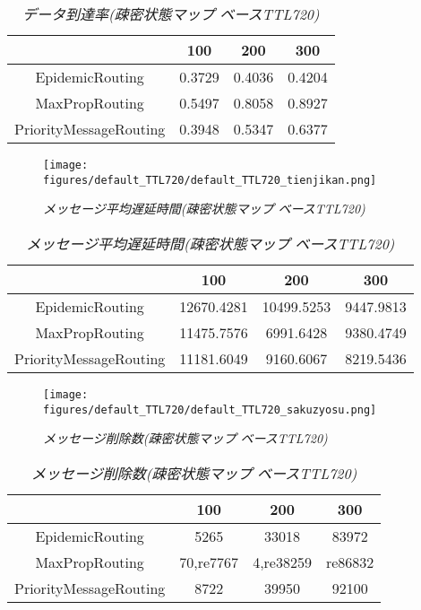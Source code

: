 \documentclass[11pt]{icsthesis}
\begin{document}
\begin{table}[H]
 \begin{center}
      \caption[]{\it{データ到達率(疎密状態マップ ベースTTL720)}}
      \label{somituTtl720deliveryprob}
      \begin{tabular}{|c|c|c|c|}
\hline
&100&200&300\\
\hline
EpidemicRouting&0.3729&0.4036&0.4204\\
\hline
MaxPropRouting&0.5497&0.8058&0.8927\\
\hline
PriorityMessageRouting&0.3948&0.5347&0.6377\\
\hline
      \end{tabular}
    \end{center}
\end{table}

\newpage

\begin{figure}[h]
\centering
\texttt{[image: figures/default\_TTL720/default\_TTL720\_tienjikan.png]}
\caption[]{\it{メッセージ平均遅延時間(疎密状態マップ ベースTTL720)}}
\label{somituttl720latencyavggraph}
\end{figure}

\begin{table}[H]
 \begin{center}
      \caption[]{\it{メッセージ平均遅延時間(疎密状態マップ ベースTTL720)}}
      \label{somituTtl720latencyavg}
      \begin{tabular}{|c|c|c|c|}
\hline
&100&200&300\\
\hline
EpidemicRouting&12670.4281&10499.5253&9447.9813\\
\hline
MaxPropRouting&11475.7576&6991.6428&9380.4749\\
\hline
PriorityMessageRouting&11181.6049&9160.6067&8219.5436\\
\hline
      \end{tabular}
    \end{center}
\end{table}

\begin{figure}[h]
\centering
\texttt{[image: figures/default\_TTL720/default\_TTL720\_sakuzyosu.png]}
\caption[]{\it{メッセージ削除数(疎密状態マップ ベースTTL720)}}
\label{somituttl720droppedgraph}
\end{figure}

\begin{table}[H]
 \begin{center}
      \caption[]{\it{メッセージ削除数(疎密状態マップ ベースTTL720)}}
      \label{somituTtl720dropped}
      \begin{tabular}{|c|c|c|c|}
\hline
&100&200&300\\
\hline
EpidemicRouting&5265&33018&83972\\
\hline
MaxPropRouting&70,re7767&4,re38259&re86832\\
\hline
PriorityMessageRouting&8722&39950&92100\\
\hline
      \end{tabular}
    \end{center}
\end{table}
\end{document}
